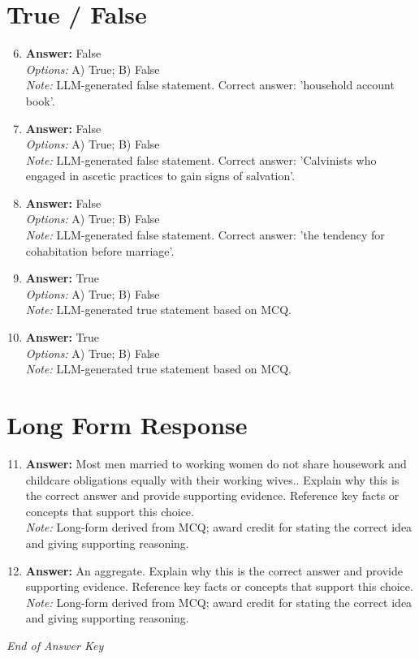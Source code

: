 \documentclass[12pt]{article}
\begin{document}
\section*{True / False}
\begin{enumerate}[label=\arabic*.]
\setcounter{enumi}{5}
\item \textbf{Answer:} False
\\ \textit{Options:} A) True; B) False
\\ \textit{Note:} LLM-generated false statement. Correct answer: 'household account book'.
\item \textbf{Answer:} False
\\ \textit{Options:} A) True; B) False
\\ \textit{Note:} LLM-generated false statement. Correct answer: 'Calvinists who engaged in ascetic practices to gain signs of salvation'.
\item \textbf{Answer:} False
\\ \textit{Options:} A) True; B) False
\\ \textit{Note:} LLM-generated false statement. Correct answer: 'the tendency for cohabitation before marriage'.
\item \textbf{Answer:} True
\\ \textit{Options:} A) True; B) False
\\ \textit{Note:} LLM-generated true statement based on MCQ.
\item \textbf{Answer:} True
\\ \textit{Options:} A) True; B) False
\\ \textit{Note:} LLM-generated true statement based on MCQ.
\end{enumerate}

\section*{Long Form Response}
\begin{enumerate}[label=\arabic*.]
\setcounter{enumi}{10}
\item \textbf{Answer:} Most men married to working women do not share housework and childcare obligations equally with their working wives.. Explain why this is the correct answer and provide supporting evidence. Reference key facts or concepts that support this choice.
\\ \textit{Note:} Long-form derived from MCQ; award credit for stating the correct idea and giving supporting reasoning.
\item \textbf{Answer:} An aggregate. Explain why this is the correct answer and provide supporting evidence. Reference key facts or concepts that support this choice.
\\ \textit{Note:} Long-form derived from MCQ; award credit for stating the correct idea and giving supporting reasoning.
\end{enumerate}

\vfill
\noindent\textit{End of Answer Key}
\end{document}
